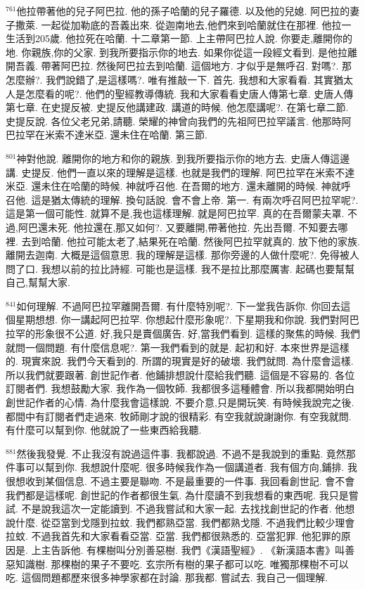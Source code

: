\documentclass{book}
\begin{document}
$^{761}$他拉帶著他的兒子阿巴拉.
他的孫子哈蘭的兒子羅德.
以及他的兒媳.
阿巴拉的妻子撒萊.
一起從加勒底的吾義出來.
從迦南地去,他們來到哈蘭就住在那裡.
他拉一生活到205歲.
他拉死在哈蘭.
十二章第一節.
上主帶阿巴拉人說.
你要走,離開你的地.
你親族,你的父家.
到我所要指示你的地去.
如果你從這一段經文看到.
是他拉離開吾義.
帶著阿巴拉.
然後阿巴拉去到哈蘭.
這個地方.
才似乎是無呼召.
對嗎?.
那怎麼辦?.
我們說錯了,是這樣嗎?.
唯有推敲一下.
首先.
我想和大家看看.
其實猶太人是怎麼看的呢?.
他們的聖經教導傳統.
我和大家看看史唐人傳第七章.
史唐人傳第七章.
在史提反被.
史提反他講建政.
講道的時候.
他怎麼講呢?.
在第七章二節.
史提反說.
各位父老兄弟,請聽.
榮耀的神曾向我們的先祖阿巴拉罕議言.
他那時阿巴拉罕在米索不達米亞.
還未住在哈蘭.
第三節.

$^{801}$神對他說.
離開你的地方和你的親族.
到我所要指示你的地方去.
史唐人傳這邊講.
史提反.
他們一直以來的理解是這樣.
也就是我們的理解.
阿巴拉罕在米索不達米亞.
還未住在哈蘭的時候.
神就呼召他.
在吾爾的地方.
還未離開的時候.
神就呼召他.
這是猶太傳統的理解.
換句話說.
會不會上帝.
第一.
有兩次呼召阿巴拉罕呢?.
這是第一個可能性.
就算不是,我也這樣理解.
就是阿巴拉罕.
真的在吾爾蒙夫罩.
不過,阿巴還未死.
他拉還在,那又如何?.
又要離開,帶著他拉.
先出吾爾.
不知要去哪裡.
去到哈蘭.
他拉可能太老了,結果死在哈蘭.
然後阿巴拉罕就真的.
放下他的家族.
離開去迦南.
大概是這個意思.
我的理解是這樣.
那你旁邊的人做什麼呢?.
免得被人問了口.
我想以前的拉比詩經.
可能也是這樣.
我不是拉比那麼厲害.
起碼也要幫幫自己,幫幫大家.

$^{841}$如何理解.
不過阿巴拉罕離開吾爾.
有什麼特別呢?.
下一堂我告訴你.
你回去這個星期想想.
你一講起阿巴拉罕.
你想起什麼形象呢?.
下星期我和你說.
我們對阿巴拉罕的形象很不公道.
好,我只是賣個廣告.
好,當我們看到.
這樣的聚焦的時候.
我們就問一個問題.
有什麼信息呢?.
第一我們看到的就是.
起初和好.
本來世界是這樣的.
現實來說.
我們今天看到的.
所謂的現實是好的破壞.
我們就問.
為什麼會這樣.
所以我們就要跟著.
創世記作者.
他鋪排想說什麼給我們聽.
這個是不容易的.
各位訂閱者們.
我想鼓勵大家.
我作為一個牧師.
我都很多這種體會.
所以我都開始明白創世記作者的心情.
為什麼我會這樣說.
不要介意,只是開玩笑.
有時候我說完之後.
都間中有訂閱者們走過來.
牧師剛才說的很精彩.
有空我就說謝謝你.
有空我就問.
有什麼可以幫到你.
他就說了一些東西給我聽.

$^{881}$然後我發覺.
不止我沒有說過這件事.
我都說過.
不過不是我說到的重點.
竟然那件事可以幫到你.
我想說什麼呢.
很多時候我作為一個講道者.
我有個方向,鋪排.
我很想收到某個信息.
不過主要是聯吻.
不是最重要的一件事.
我回看創世記.
會不會我們都是這樣呢.
創世記的作者都很生氣.
為什麼讀不到我想看的東西呢.
我只是嘗試.
不是說我這次一定能讀到.
不過我嘗試和大家一起.
去找找創世記的作者.
他想說什麼.
從亞當到戈隱到拉蚊.
我們都熟亞當.
我們都熟戈隱.
不過我們比較少理會拉蚊.
不過我首先和大家看看亞當.
亞當.
我們都很熟悉的.
亞當犯罪.
他犯罪的原因是.
上主告訴他.
有棵樹叫分別善惡樹.
我們《漢語聖經》.
《新漢語本書》叫善惡知識樹.
那棵樹的果子不要吃.
玄宗所有樹的果子都可以吃.
唯獨那棵樹不可以吃.
這個問題都歷來很多神學家都在討論.
那我都.
嘗試去.
我自己一個理解.
\end{document}
